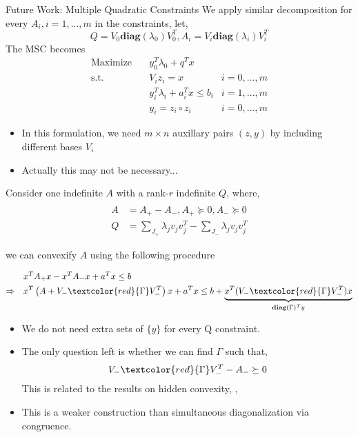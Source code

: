 \documentclass[aspectratio=1610, 10pt]{beamer}
\newcommand{\diag}{\mathbf{diag}}
\newcommand{\red}[1]{\textcolor{red}{#1}}
\begin{document}
\begin{frame}[allowframebreaks]{Future Work: Multiple Quadratic Constraints}
  We apply similar decomposition for every \(A_i, i=1,...,m\) in the constraints, let, \[Q = V_0 \diag(\lambda_0) V_0^T, A_i = V_i \diag(\lambda_i) V_i^T\]
  The MSC becomes
  \begin{align}
    \nonumber \mathrm{Maximize}\quad & y_0 ^T\lambda_0 + q^Tx                         \\
    \mathrm{s.t.} \quad              & V_i z_i = x                        & i=0,...,m \\
                                     & y_i ^T\lambda_i  + a_i^Tx  \le b_i & i=1,...,m \\
    \label{quad}                     & y_i = z_i \circ z_i                & i=0,...,m
  \end{align}
  \begin{itemize}
    \item In this formulation, we need \(m \times n\) auxillary pairs \((z, y)\) by including different bases \(V_i\)
    \item Actually this may not be necessary...
  \end{itemize}

  \framebreak
  Consider one indefinite \(A\) with a rank-\(r\) indefinite \(Q\), where,
  \begin{align*} \\
    A & = A_+ - A_-, A_+ \succeq 0, A_- \succeq 0                       \\
    Q & = \sum_{J_+} \lambda_j v_jv_j^T - \sum_{J_-} \lambda_j v_jv_j^T
  \end{align*}

  we can convexify \(A\) using the following procedure

  \begin{eqnarray}
    & x^TA_+ x - x^TA_-x + a^Tx \le b \\
    \Rightarrow \quad & x^T\left(A + V_-\red{\Gamma}V^T_-\right )x +a^Tx \le b + \underbrace{x^T(V_-\red{\Gamma}V^T_-)x}_{\diag(\Gamma)^Ty}
  \end{eqnarray}

  \framebreak

  \begin{itemize}
    \item We do not need extra sets of \(\{y\}\) for every Q constraint.
    \item The only question left is whether we can find \(\Gamma\) such that,
          \begin{equation}
            V_-\red{\Gamma}V^T_- - A_- \succeq 0
          \end{equation}
          This is related to the results on hidden convexity, \cite{burer_how_2017}, \cite{modaresi_convex_2017}
    \item This is a weaker construction than simultaneous diagonalization via congruence. \cite{wang_new_2021}
  \end{itemize}
\end{frame}
\end{document}
